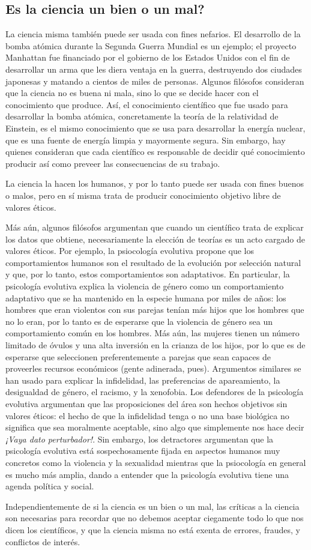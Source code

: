 \subsection*{Es la ciencia un bien o un mal?}
\label{sub:eslacienciaunbienounmal}

La ciencia misma también puede ser usada con fines nefarios.
El desarrollo de la bomba atómica durante la Segunda Guerra Mundial es un
ejemplo; el proyecto Manhattan fue financiado por el gobierno de los Estados
Unidos con el fin de desarrollar un arma que les diera ventaja en la guerra,
destruyendo dos ciudades japonesas y matando a cientos de miles de personas.
Algunos filósofos consideran que la ciencia no es buena ni mala, sino lo que
se decide hacer con el conocimiento que produce.
Así, el conocimiento científico que fue usado para desarrollar la bomba atómica,
concretamente la teoría de la relatividad de Einstein, es el mismo conocimiento
que se usa para desarrollar la energía nuclear, que es una fuente de energía
limpia y mayormente segura.
Sin embargo, hay quienes consideran que cada científico es responsable de
decidir qué conocimiento producir así como preveer las consecuencias de su
trabajo.

\begin{remember}
    \label{rem:cienciabienomal}
    La ciencia la hacen los humanos, y por lo tanto puede ser usada con fines
    buenos o malos, pero en sí misma trata de producir conocimiento objetivo
    libre de valores éticos.
\end{remember}

Más aún, algunos filósofos argumentan que cuando un científico trata de
explicar los datos que obtiene, necesariamente la elección de teorías es un
acto cargado de valores éticos.
Por ejemplo, la psiocología evolutiva propone que los comportamientos humanos
son el resultado de la evolución por selección natural y que, por lo tanto,
estos comportamientos son adaptativos.
En particular, la psicología evolutiva explica la violencia de género como un
comportamiento adaptativo que se ha mantenido en la especie humana por miles de
años: los hombres que eran violentos con sus parejas tenían más hijos que los
hombres que no lo eran, por lo tanto es de esperarse que la violencia de género
sea un comportamiento común en los hombres.
Más aún, las mujeres tienen un número limitado de óvulos y una alta inversión
en la crianza de los hijos, por lo que es de esperarse que seleccionen
preferentemente a parejas que sean capaces de proveerles recursos económicos
(gente adinerada, pues).
Argumentos similares se han usado para explicar la infidelidad, las preferencias
de apareamiento, la desigualdad de género, el racismo, y la xenofobia.
Los defendores de la psicología evolutiva argumentan que las proposiciones del
área son hechos objetivos sin valores éticos: el hecho de que la infidelidad
tenga o no una base biológica no significa que sea moralmente aceptable,
sino algo que simplemente nos hace decir \emph{¡Vaya dato perturbador!}.
Sin embargo, los detractores argumentan que la psicología evolutiva está
sospechosamente fijada en aspectos humanos muy concretos como la violencia y la
sexualidad mientras que la psiocología en general es mucho más amplia, dando a
entender que la psicología evolutiva tiene una agenda política y social.

Independientemente de si la ciencia es un bien o un mal, las críticas a la
ciencia son necesarias para recordar que no debemos aceptar ciegamente todo lo
que nos dicen los científicos, y que la ciencia misma no está exenta de
errores, fraudes, y conflictos de interés.
